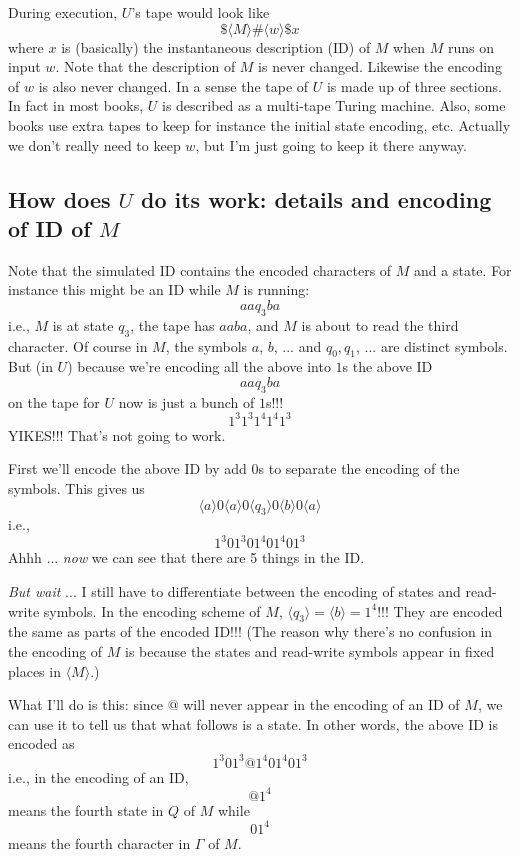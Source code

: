 During execution, $U$'s tape would look like
\[
\$ \langle M \rangle \# \langle w \rangle \$ x
\]
where $x$ is (basically) the instantaneous description (ID)
of $M$ when $M$ runs on input
$w$.
Note that the description of $M$ is never changed.
Likewise the encoding of $w$ is also never changed.
In a sense the tape of $U$ is made up of three sections.
In fact in most books, $U$ is described as a multi-tape Turing machine.
Also, some books use extra tapes to keep for instance the initial state
encoding, etc.
Actually we don't really need to keep $w$, but I'm just going to keep it
there anyway.

\subsection{How does $U$ do its work: details and encoding of ID of $M$}

Note that the simulated ID contains the encoded characters of $M$
and a state.
For instance this might be an ID while $M$ is running:
\[
a a q_3 b a
\]
i.e., $M$ is at state $q_3$, the tape has $aaba$,  and
$M$ is about to read the third character.
Of course in $M$, the symbols $a$, $b$, ... and $q_0, q_1$, ... are distinct
symbols.
But (in $U$) because we're encoding all the above
into $1$s
the above ID
\[
a a q_3 b a
\]
on the tape for $U$ now is just a bunch of $1$s!!!
\[
1^3 1^3 1^4 1^4 1^3
\]
YIKES!!!
That's not going to work.

First we'll encode the above ID by add $0$s to separate the
encoding of the symbols.
This gives us
\[
\langle a \rangle 0
\langle a \rangle 0
\langle q_3 \rangle 0
\langle b \rangle 0
\langle a \rangle
\]
i.e.,
\[
1^3 0
1^3 0 
1^4 0
1^4 0
1^3
\]
Ahhh ... \textit{now} we can see that there are 5 things in the ID.

\textit{But wait} ... I still have to differentiate between the encoding
of states and read-write symbols.
In the encoding scheme of $M$,
$\langle q_3 \rangle = \langle b \rangle = 1^4$!!!
They are encoded the same as parts of the encoded ID!!!
(The reason why there's no confusion in the encoding of $M$
is because the states and read-write symbols appear in fixed places
in $\langle M \rangle$.)

What I'll do is this:
since $@$ will never appear in the encoding of
an ID of $M$, we can use it to tell us that what follows is a state.
In other words, the above ID is encoded as
\[
1^3 0 1^3 @ 1^4 0 1^4 0 1^3 
\]
i.e., in the encoding of an ID,
\[
@ 1^4
\]
means the fourth state in $Q$ of $M$ while
\[
0 1^4
\]
means the fourth character in $\Gamma$ of $M$.


